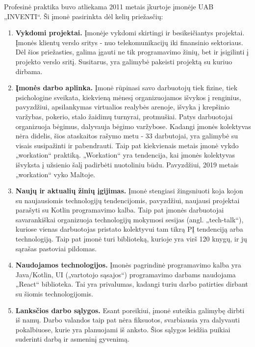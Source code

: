 Profesinė praktika buvo atliekama 2011 metais įkurtoje įmonėje UAB „INVENTI“. Ši įmonė pasirinkta dėl kelių priežasčių:

\begin{enumerate}
    \item \textbf{Vykdomi projektai.} Įmonėje vykdomi skirtingi ir besikeičiantys projektai. Įmonės klientų verslo sritys - nuo telekomunikacijų iki finansinio sektoriaus.
    Dėl šios priežasties, galima įgauti ne tik programavimo žinių, bet ir įsigilinti į projekto verslo sritį. Susitarus, yra galimybė pakeisti projektą su kuriuo dirbama.
    \item \textbf{Įmonės darbo aplinka.} Įmonė rūpinasi savo darbuotojų tiek fizine, tiek psichologine sveikata, kiekvieną mėnesį organizuojamos išvykos į renginius, pavyzdžiui,
    apsilankymas virtualios realybės arenoje, išvyka į krepšinio varžybas, pokerio, stalo žaidimų turnyrai, protmušiai. Patys darbuotojai organizuoja bėgimus, dalyvauja bėgimo
    varžybose. Kadangi įmonės kolektyvas nėra didelis, šios ataskaitos rašymo metu - 33 darbutojai, yra galimybė su visais susipažinti ir pabendrauti.
    Taip pat kiekvienais metais įmonė vykdo „workation“ praktiką. „Workation“ yra tendencija, kai įmonės kolektyvas išvyksta į užsienio šalį padirbėti nuotoliniu būdu.
    Pavyzdžiui, 2019 metais „workation“ vyko Maltoje.
    \item \textbf{Naujų ir aktualių žinių įgijimas.} Įmonė stengiasi žingsniuoti koja kojon su naujausiomis technologijų tendencijomis, pavyzdžiui, naujausi projektai parašyti su
    Kotlin programavimo kalba. Taip pat įmonės darbuotojai savarankiškai organizuoja technologijų mokymosi sesijas (angl. „tech-talk“), kuriose vienas darbuotojas pristato kolektyvui
    tam tikrą PĮ tendenciją arba technologiją. Taip pat įmonė turi biblioteką, kurioje yra virš 120 knygų, ir jų sąrašas pastoviai pildomas.
    \item \textbf{Naudojamos technologijos.} Įmonės pagrindinė programavimo kalba yra Java/Kotlin, UI („vartotojo sąsajos“) programavimo darbams naudojama „React“ biblioteka. Tai yra privalumas,
    kadangi turiu darbo patirties dirbant su šiomis technologijomis.
    \item \textbf{Lanksčios darbo sąlygos.} Esant poreikiui, įmonė suteikia galimybę dirbti iš namų.
    Darbo valandos taip pat nėra fiksuotos, svarbiausia yra dalyvauti pokalbiuose, kurie yra planuojami iš anksto. Šios sąlygos leidžia
    puikiai suderinti darbą ir asmeninį gyvenimą.
\end{enumerate}

